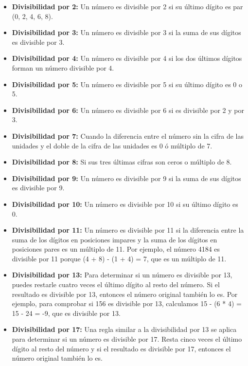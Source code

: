 \begin{itemize}
	\item \textbf{Divisibilidad por 2:} Un número es divisible por 2 si su último dígito es par (0, 2, 4, 6, 8).
	\item \textbf{Divisibilidad por 3:} Un número es divisible por 3 si la suma de sus dígitos es divisible por 3.
	\item \textbf{Divisibilidad por 4:} Un número es divisible por 4 si los dos últimos dígitos forman un número divisible por 4.
	\item \textbf{Divisibilidad por 5:} Un número es divisible por 5 si su último dígito es 0 o 5.
	\item \textbf{Divisibilidad por 6:} Un número es divisible por 6 si es divisible por 2 y por 3.
	\item \textbf{Divisibilidad por 7:} Cuando la diferencia entre el número sin la cifra de las unidades y el doble de la cifra de las unidades es 0 ó múltiplo de 7.
	\item \textbf{Divisibilidad por 8:} Si sus tres últimas cifras son ceros o múltiplo de 8.
	\item \textbf{Divisibilidad por 9:} Un número es divisible por 9 si la suma de sus dígitos es divisible por 9.
	\item \textbf{Divisibilidad por 10:} Un número es divisible por 10 si su último dígito es 0. 
	 
	\item \textbf{Divisibilidad por 11:} Un número es divisible por 11 si la diferencia entre la suma de los dígitos en posiciones impares y la suma de los dígitos en posiciones pares es un múltiplo de 11. Por ejemplo, el número 4184 es divisible por 11 porque (4 + 8) - (1 + 4) = 7, que es un múltiplo de 11.
	
	\item \textbf{Divisibilidad por 13:} Para determinar si un número es divisible por 13, puedes restarle cuatro veces el último dígito al resto del número. Si el resultado es divisible por 13, entonces el número original también lo es. Por ejemplo, para comprobar si 156 es divisible por 13, calculamos 15 - (6 * 4) = 15 - 24 = -9, que es divisible por 13.
	
	\item \textbf{Divisibilidad por 17:} Una regla similar a la divisibilidad por 13 se aplica para determinar si un número es divisible por 17. Resta cinco veces el último dígito al resto del número y si el resultado es divisible por 17, entonces el número original también lo es.
\end{itemize}

